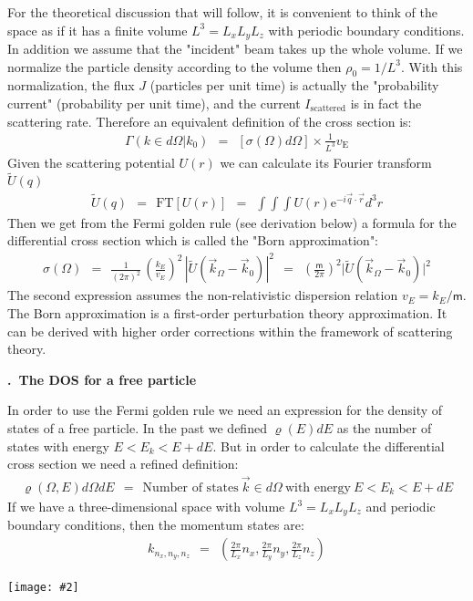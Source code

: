 \documentclass[onecolumn,fleqn, 11pt]{revtex4}
\newcommand{\eexp}{\mathrm{e}^}
\newcommand{\mass}{\mathsf{m}}
\newcommand{\gdos}{\varrho} \newcommand{\EPS}{\mathcal{E}}
\newcommand{\tbox}[1]{\text{#1}}
\newcommand{\putgraph}[2][0.30\hsize]{\texttt{[image: \#2]}}
\newcommand{\beq}{\begin{eqnarray}}
\newcommand{\eeq}{\end{eqnarray}}
\renewcommand{\thesubsection}{\arabic{subsection}}
\renewcommand{\thesubsubsection}{\arabic{subsubsection}}
\newcommand{\sheadC}[1]
{
\addtocounter{subsubsection}{1}
\vspace{5mm}
{\bf \thesubsection.\thesubsubsection \ #1}  
\nopagebreak
\phantomsection
}
\begin{document}
For the theoretical discussion that will follow, 
it is convenient to think of the space as if it has a finite 
volume ${ L^3 = L_x L_y L_z}$ with periodic boundary 
conditions. In addition we assume that the "incident" 
beam takes up the whole volume. If we normalize the particle 
density according to the volume then ${\rho_0=1/L^3}$. 
With this normalization, the flux $J$ (particles per unit time) 
is actually the "probability current" (probability per unit time), 
and the current $I_{\text{scattered}}$ is in fact 
the scattering rate. Therefore an equivalent definition 
of the cross section is:
\beq
\Gamma( k \in d\Omega | k_0 )  \ \ = \ \  [\sigma(\Omega)d\Omega] \times \frac{1}{L^3}v_{\tbox{E}} 
\eeq
Given the scattering potential $U(r)$ we can calculate 
its Fourier transform ${\tilde{U}(q)}$
\beq
\tilde{U}(q)  \ \ = \ \  \text{FT} [U(r)]  
 \ \ = \ \  \int\int\int U(r) \eexp{-i\vec{q} \cdot \vec{r}} d^3r 
\eeq
Then we get from the Fermi golden rule (see derivation below) 
a formula for the differential cross section 
which is called the "Born approximation":
\beq
\sigma(\Omega)
\ \ = \ \ 
\frac{1}{ (2\pi)^2 } \, \left(\frac{k_E}{v_E}\right)^2 \, |\tilde{U}(\vec{k}_{\Omega}-\vec{k}_0)|^2 
\ \ = \ \ 
\left(\frac{\mass}{2\pi}\right)^2 \Big|\tilde{U}(\vec{k}_{\Omega}-\vec{k}_{0})\Big|^2 
\eeq
The second expression assumes the non-relativistic 
dispersion relation ${v_E=k_E/\mass}$.   
The Born approximation is a first-order 
perturbation theory approximation. 
It can be derived with higher order corrections  
within the framework of scattering theory.


 
\sheadC{The DOS for a free particle} 

In order to use the Fermi golden rule we need an expression 
for the density of states of a free particle. In the past 
we defined ${\gdos(E)dE}$ as the number of states 
with energy ${E<E_k<E+dE}$. But in order to calculate 
the differential cross section we need a refined definition:
\beq
\gdos(\Omega,E) d\Omega dE
 \ \  = \ \  
\text{Number of states} \ \vec{k} \in d\Omega  \ \mbox{with energy} \ E< E_k<E+dE  
\eeq
If we have a three-dimensional space with 
volume ${ L^3 = L_x L_y L_z }$ and periodic  
boundary conditions, then the momentum states are:
\beq
k_{n_x,n_y,n_z}
 \ \ = \ \  
\left( \frac{2\pi}{L_x}n_x, \frac{2\pi}{L_y}n_y, \frac{2\pi}{L_z}n_z\right) 
\eeq


\begin{center}
\putgraph[0.4\hsize]{AllowedStates}
\end{center}
\end{document}
